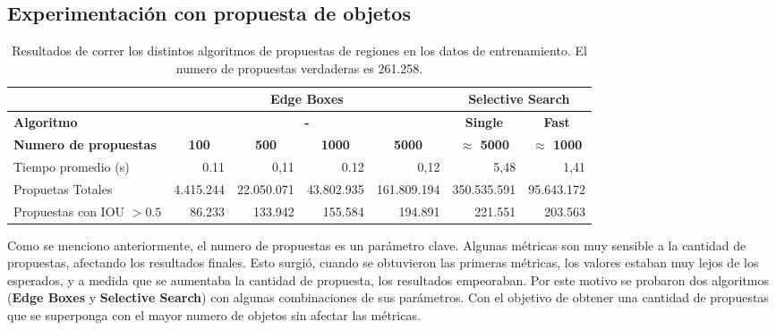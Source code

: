 \subsection{Experimentación con propuesta de objetos} \label{ssec:experimentacionconpropuestadeobjetos}
\begin{table}[]
	\centering
	\resizebox{12.5cm}{!} {
		\begin{tabular}{|l|c|r|r|r|c|r|}
			\hline
			\textbf{}                     & \multicolumn{4}{c|}{\textbf{Edge Boxes}}                                                                                                   & \multicolumn{2}{c|}{\textbf{Selective Search}}               \\ \hline
			\textbf{Algoritmo}            & \multicolumn{4}{c|}{\textbf{-}}                                                                                                            & \textbf{Single}         & \multicolumn{1}{c|}{\textbf{Fast}} \\ \hline
			\textbf{Numero de propuestas} & \textbf{100}                 & \multicolumn{1}{c|}{\textbf{500}} & \multicolumn{1}{c|}{\textbf{1000}} & \multicolumn{1}{c|}{\textbf{5000}} & \textbf{$\approx$ 5000} & \multicolumn{1}{c|}{\textbf{$\approx$ 1000}}  \\ \hline
			Tiempo promedio (s)           & \multicolumn{1}{r|}{0.11}    & 0,11                              & 0.12                               & 0,12                               & \multicolumn{1}{r|}{5,48}   &         1,41                           \\ \hline
			Propuetas Totales             & \multicolumn{1}{r|}{4.415.244} & 22.050.071                          & 43.802.935                           & 161.809.194                          & \multicolumn{1}{r|}{350.535.591}   &   95.643.172                                 \\ \hline
			Propuestas con IOU $> 0.5$    & \multicolumn{1}{r|}{86.233}   & 133.942                            & 155.584                             & 194.891                             & \multicolumn{1}{r|}{221.551}   & 203.563                                   \\ \hline
		\end{tabular}
	}
	\caption{Resultados de correr los distintos algoritmos de propuestas de regiones en los datos de entrenamiento. El numero de propuestas verdaderas es 261.258.}
	\label{tab:edgeVSselct}
\end{table}

Como se menciono anteriormente, el numero de propuestas es un parámetro clave. Algunas métricas son muy sensible a la cantidad de propuestas, afectando los resultados finales. Esto surgió, cuando se obtuvieron las primeras métricas, los valores estaban muy lejos de los esperados, y a medida que se aumentaba la cantidad de propuesta, los resultados empeoraban. Por este motivo se probaron dos algoritmos (\textbf{Edge Boxes} y \textbf{Selective Search}) con algunas combinaciones de sus parámetros. Con el objetivo de obtener una cantidad de propuestas que se superponga con el mayor numero de objetos sin afectar las métricas.\\

